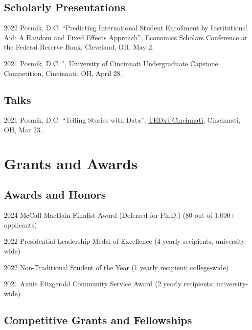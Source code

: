 \documentclass[11pt,letterpaper]{report}
\begin{document}
\subsection*{Scholarly Presentations}
\begin{tablist}
\item[2022] \tab{}Posmik, D.C. \enquote{Predicting International Student Enrollment by Institutional Aid: A Random and Fixed Effects Approach}, Economics Scholars Conference at the Federal Reserve Bank, Cleveland, OH, May 2. 
\item[2021] \tab{}Posmik, D.C. \textemdash{}"\textemdash{}, University of Cincinnati Undergraduate Capstone Competition, Cincinnati, OH, April 28. 
\end{tablist}

\subsection*{Talks}
\begin{tablist}
\item[2021] \tab{}Posmik, D.C. \enquote{Telling Stories with Data}, \href{https://www.youtube.com/watch?v=-Le0WTfBuBY}{TEDxUCincinnati}, Cincinnati, OH, Mar 23. 
\end{tablist}

\section*{Grants and Awards}

\subsection*{Awards and Honors}
\begin{tablist}
\item[2024] \tab{} McCall MacBain Finalist Award (Deferred for Ph.D.) (80 out of 1,000+ applicants)
\item[2022] \tab{} Presidential Leadership Medal of Excellence (4 yearly recipients; university-wide) 
\item[2022] \tab{} Non-Traditional Student of the Year (1 yearly recipient; college-wide) 
\item[2021] \tab{} Annie Fitzgerald Community Service Award (2 yearly recipients; university-wide)
\end{tablist}

\subsection*{Competitive Grants and Fellowships}
\end{document}
